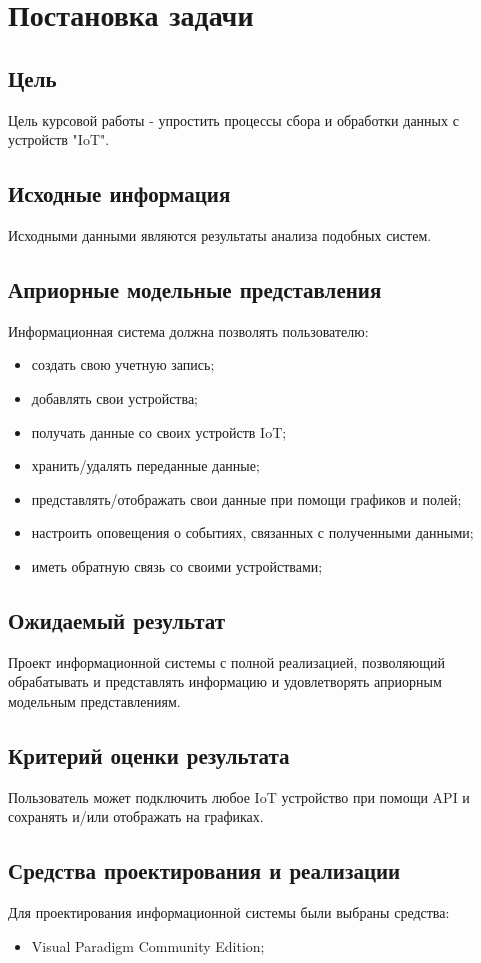 
    \section{Постановка задачи}
    \subsection{Цель}
    Цель курсовой работы - упростить процессы сбора и обработки данных с устройств "IoT".
    \subsection{Исходные информация}
    Исходными данными являются результаты анализа подобных систем.
    \subsection{Априорные модельные представления}
    Информационная система должна позволять пользователю:
    \begin{itemize}
        \item создать свою учетную запись;
        \item добавлять свои устройства;
        \item получать данные со своих устройств IoT;
        \item хранить/удалять переданные данные;
        \item представлять/отображать свои данные при помощи графиков и полей;
        \item настроить оповещения о событиях, связанных с полученными данными;
        \item иметь обратную связь со своими устройствами;
    \end{itemize}
    \subsection{Ожидаемый результат}
    Проект информационной системы с полной реализацией, позволяющий обрабатывать и представлять информацию
    и удовлетворять априорным модельным представлениям.
    \subsection{Критерий оценки результата}
    Пользователь может подключить любое IoT устройство при помощи API и сохранять и/или отображать на графиках.
    \subsection{Средства проектирования и реализации}
    Для проектирования информационной системы были выбраны средства:
    \begin{itemize}
        \item Visual Paradigm Community Edition;
    \end{itemize}
